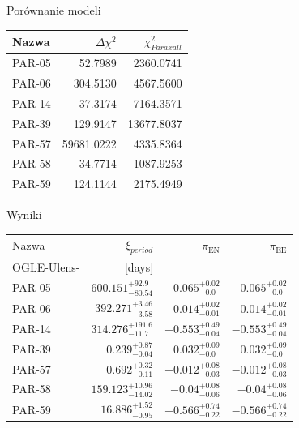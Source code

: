 \documentclass{beamer}
\begin{document}
\begin{frame}{Porównanie modeli}
    \begin{table}[h]
        \centering
        \begin{tabularx}{\linewidth}{X r r}
            \toprule
            Nazwa  & $\Delta\chi^2$ & $\chi^2 _{Paraxall}$ \\
            \midrule
            PAR-05 & 52.7989        & 2360.0741            \\
            PAR-06 & 304.5130       & 4567.5600            \\
            PAR-14 & 37.3174        & 7164.3571            \\
            PAR-39 & 129.9147       & 13677.8037           \\
            PAR-57 & 59681.0222     & 4335.8364            \\
            PAR-58 & 34.7714        & 1087.9253            \\
            PAR-59 & 124.1144       & 2175.4949            \\
            \bottomrule
        \end{tabularx}
    \end{table}

\end{frame}

\begin{frame}{Wyniki}
    \begin{tabularx}{\linewidth}{X r r r}
        \toprule
        Nazwa       & $\xi_{period}$                & $\pi_{\text{EN}}$          & $\pi_{\text{EE}}$          \\
        OGLE-Ulens- & [days]                        &                            &                            \\
        \midrule
        PAR-05      & $600.151_{-80.54 } ^{+92.9}$  & $0.065_{-0.0 } ^{+0.02}$   & $0.065_{-0.0 } ^{+0.02}$   \\
        PAR-06      & $392.271_{-3.58 } ^{+3.46}$   & $-0.014_{-0.01 } ^{+0.02}$ & $-0.014_{-0.01 } ^{+0.02}$ \\
        PAR-14      & $314.276_{-11.7 } ^{+191.6}$  & $-0.553_{-0.04 } ^{+0.49}$ & $-0.553_{-0.04 } ^{+0.49}$ \\
        PAR-39      & $0.239_{-0.04 } ^{+0.87}$     & $0.032_{-0.0 } ^{+0.09}$   & $0.032_{-0.0 } ^{+0.09}$   \\
        PAR-57      & $0.692_{-0.11 } ^{+0.32}$     & $-0.012_{-0.03 } ^{+0.08}$ & $-0.012_{-0.03 } ^{+0.08}$ \\
        PAR-58      & $159.123_{-14.02 } ^{+10.96}$ & $-0.04_{-0.06 } ^{+0.08}$  & $-0.04_{-0.06 } ^{+0.08}$  \\
        PAR-59      & $16.886_{-0.95 } ^{+1.52}$    & $-0.566_{-0.22 } ^{+0.74}$ & $-0.566_{-0.22 } ^{+0.74}$ \\
        \bottomrule
    \end{tabularx}
\end{frame}
\end{document}
